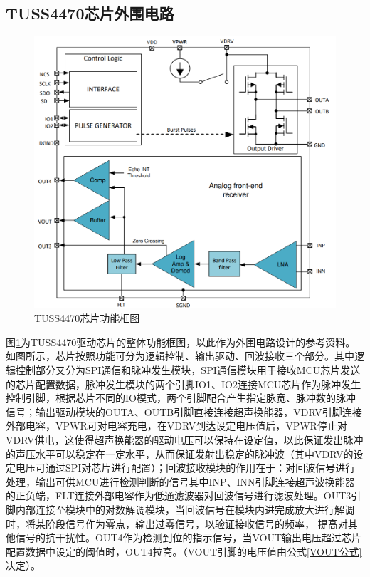 \newpage
\subsection{TUSS4470芯片外围电路}


\begin{figure}[ht]
	\centering
	\includegraphics[width=12cm]{figure/Function Block Diagram.png}
	\caption{TUSS4470芯片功能框图}
	\label{TUSS4470芯片功能框图}%
\end{figure}
图\ref{TUSS4470芯片功能框图}为TUSS4470驱动芯片的整体功能框图，以此作为外围电路设计的参考资料。如图所示，芯片按照功能可分为逻辑控制、输出驱动、回波接收三个部分。其中逻辑控制部分又分为SPI通信和脉冲发生模块，SPI通信模块用于接收MCU芯片发送的芯片配置数据，脉冲发生模块的两个引脚IO1、IO2连接MCU芯片作为脉冲发生控制引脚，根据芯片不同的IO模式，两个引脚配合产生指定脉宽、脉冲数的脉冲信号；输出驱动模块的OUTA、OUTB引脚直接连接超声换能器，VDRV引脚连接外部电容，VPWR可对电容充电，在VDRV到达设定电压值后，VPWR停止对VDRV供电，这使得超声换能器的驱动电压可以保持在设定值，以此保证发出脉冲的声压水平可以稳定在一定水平，从而保证发射出稳定的脉冲波（其中VDRV的设定电压可通过SPI对芯片进行配置）；回波接收模块的作用在于：对回波信号进行处理，输出可供MCU进行检测判断的信号其中INP、INN引脚连接超声波换能器的正负端，FLT连接外部电容作为低通滤波器对回波信号进行滤波处理。OUT3引脚内部连接至模块中的对数解调模块，当回波信号在模块内进完成放大进行解调时，将某阶段信号作为零点，输出过零信号，以验证接收信号的频率， 提高对其他信号的抗干扰性。OUT4作为检测到位的指示信号，当VOUT输出电压超过芯片配置数据中设定的阈值时，OUT4拉高。（VOUT引脚的电压值由公式\ref{VOUT公式}决定）。

